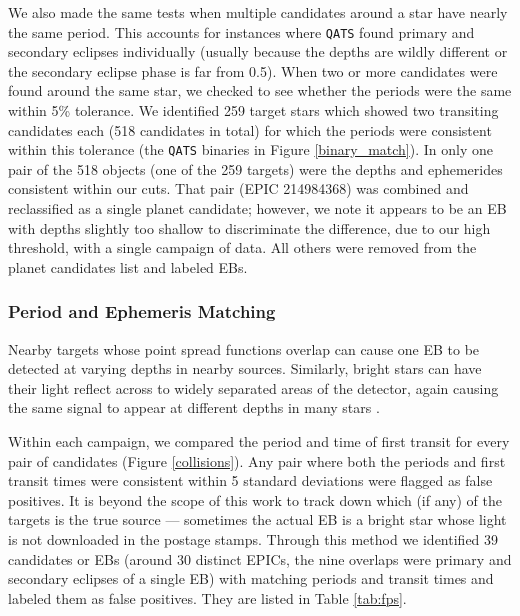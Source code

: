 \documentclass[twocolumn]{aastex62}
\newcommand{\pipeline}[1]{\texttt{#1}}
\newcommand{\qatsebs}{259}
\newcommand{\twoqatsebs}{518}
\newcommand{\nfps}{39}
\newcommand{\nfpsys}{30}
\begin{document}
We also made the same tests when multiple candidates around a star
have nearly the same period.  This accounts for instances where
\pipeline{QATS} found primary and secondary eclipses individually
(usually because the depths are wildly different or the secondary
eclipse phase is far from 0.5).  When two or more candidates were
found around the same star, we checked to see whether the periods were
the same within 5\% tolerance.  We identified \qatsebs{} target stars
which showed two transiting candidates each (\twoqatsebs{} candidates
in total) for which the periods were consistent within this tolerance
(the \pipeline{QATS} binaries in Figure \ref{binary_match}). In only
one pair of the \twoqatsebs{} objects (one of the \qatsebs{} targets)
were the depths and ephemerides consistent within our cuts. That pair
(EPIC 214984368) was combined and reclassified as a single planet
candidate; however, we note it appears to be an EB with depths
slightly too shallow to discriminate the difference, due to our high
threshold, with a single campaign of data. All others were removed
from the planet candidates list and labeled EBs.


\subsubsection{Period and Ephemeris Matching}
\label{ephems}

Nearby targets whose point spread functions overlap can cause one EB
to be detected at varying depths in nearby sources. Similarly, bright
stars can have their light reflect across to widely separated areas of
the detector, again causing the same signal to appear at different
depths in many stars \citep{cou14}.

Within each campaign, we compared the period and time of first transit
for every pair of candidates (Figure \ref{collisions}). Any pair where
both the periods and first transit times were consistent within 5
standard deviations were flagged as false positives. It is beyond the
scope of this work to track down which (if any) of the targets is the
true source --- sometimes the actual EB is a bright star whose light
is not downloaded in the postage stamps. Through this method we
identified \nfps{} candidates or EBs (around \nfpsys{} distinct EPICs,
the nine overlaps were primary and secondary eclipses of a single EB)
with matching periods and transit times and labeled them as false
positives. They are listed in Table \ref{tab:fps}.
\end{document}
